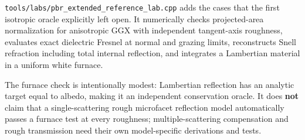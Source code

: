 \texttt{tools/labs/pbr\_extended\_reference\_lab.cpp} adds the cases that the first isotropic oracle explicitly left open. It numerically checks projected-area normalization for anisotropic GGX with independent tangent-axis roughness, evaluates exact dielectric Fresnel at normal and grazing limits, reconstructs Snell refraction including total internal reflection, and integrates a Lambertian material in a uniform white furnace.

The furnace check is intentionally modest: Lambertian reflection has an analytic target equal to albedo, making it an independent conservation oracle. It does \textbf{not} claim that a single-scattering rough microfacet reflection model automatically passes a furnace test at every roughness; multiple-scattering compensation and rough transmission need their own model-specific derivations and tests.

